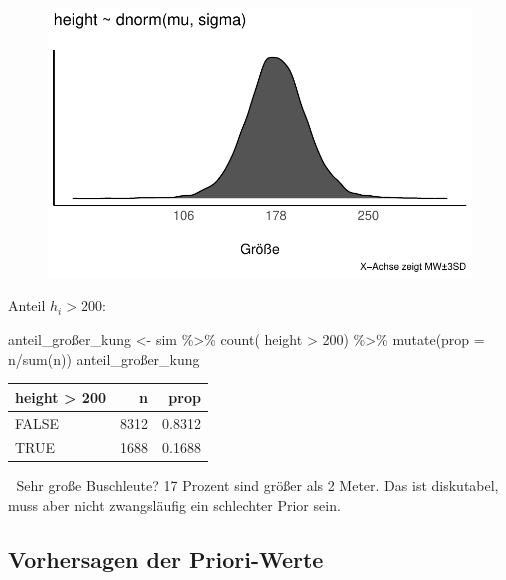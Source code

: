 \documentclass[
  a4paper,
  DIV=11]{scrreprt}
\newenvironment{Shaded}{\begin{snugshade}}{\end{snugshade}}
\newcommand{\AttributeTok}[1]{\textcolor[rgb]{0.40,0.45,0.13}{#1}}
\newcommand{\DecValTok}[1]{\textcolor[rgb]{0.68,0.00,0.00}{#1}}
\newcommand{\FunctionTok}[1]{\textcolor[rgb]{0.28,0.35,0.67}{#1}}
\newcommand{\NormalTok}[1]{\textcolor[rgb]{0.00,0.23,0.31}{#1}}
\newcommand{\OtherTok}[1]{\textcolor[rgb]{0.00,0.23,0.31}{#1}}
\newcommand{\SpecialCharTok}[1]{\textcolor[rgb]{0.37,0.37,0.37}{#1}}
\theoremstyle{definition}
\theoremstyle{remark}
\begin{document}
\begin{figure}[H]

{\centering \includegraphics{./gauss_files/figure-pdf/Kung-13-1.pdf}

}

\end{figure}

Anteil \(h_i > 200\):

\begin{Shaded}
\begin{Highlighting}[]
\NormalTok{anteil\_großer\_kung }\OtherTok{\textless{}{-}} 
\NormalTok{sim }\SpecialCharTok{\%\textgreater{}\%} 
  \FunctionTok{count}\NormalTok{( height }\SpecialCharTok{\textgreater{}} \DecValTok{200}\NormalTok{) }\SpecialCharTok{\%\textgreater{}\%} 
  \FunctionTok{mutate}\NormalTok{(}\AttributeTok{prop =}\NormalTok{ n}\SpecialCharTok{/}\FunctionTok{sum}\NormalTok{(n))}
\NormalTok{anteil\_großer\_kung}
\end{Highlighting}
\end{Shaded}

\begin{longtable}[]{@{}lrr@{}}
\toprule()
height \textgreater{} 200 & n & prop \\
\midrule()
\endhead
FALSE & 8312 & 0.8312 \\
TRUE & 1688 & 0.1688 \\
\bottomrule()
\end{longtable}

🤔 Sehr große Buschleute? 17 Prozent sind größer als 2 Meter. Das ist
diskutabel, muss aber nicht zwangsläufig ein schlechter Prior sein.

\hypertarget{vorhersagen-der-priori-werte}{%
\subsection{Vorhersagen der
Priori-Werte}\label{vorhersagen-der-priori-werte}}
\end{document}
